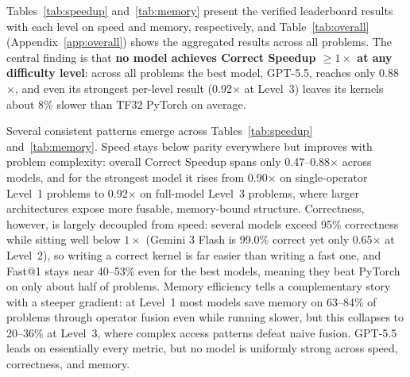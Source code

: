 \documentclass[11pt]{article}
\begin{document}
Tables~\ref{tab:speedup} and~\ref{tab:memory} present the verified leaderboard results with each level on speed and memory, respectively, and Table~\ref{tab:overall} (Appendix~\ref{app:overall}) shows the aggregated results across all problems. The central finding is that \textbf{no model achieves Correct Speedup $\geq 1\times$ at any difficulty level}: across all problems the best model, GPT-5.5, reaches only 0.88$\times$, and even its strongest per-level result (0.92$\times$ at Level~3) leaves its kernels about 8\% slower than TF32 PyTorch on average.

Several consistent patterns emerge across Tables~\ref{tab:speedup} and~\ref{tab:memory}. Speed stays below parity everywhere but improves with problem complexity: overall Correct Speedup spans only 0.47--0.88$\times$ across models, and for the strongest model it rises from 0.90$\times$ on single-operator Level~1 problems to 0.92$\times$ on full-model Level~3 problems, where larger architectures expose more fusable, memory-bound structure. Correctness, however, is largely decoupled from speed: several models exceed 95\% correctness while sitting well below $1\times$ (Gemini 3 Flash is 99.0\% correct yet only 0.65$\times$ at Level~2), so writing a correct kernel is far easier than writing a fast one, and Fast@1 stays near 40--53\% even for the best models, meaning they beat PyTorch on only about half of problems. Memory efficiency tells a complementary story with a steeper gradient: at Level~1 most models save memory on 63--84\% of problems through operator fusion even while running slower, but this collapses to 20--36\% at Level~3, where complex access patterns defeat naive fusion. GPT-5.5 leads on essentially every metric, but no model is uniformly strong across speed, correctness, and memory.
\end{document}
